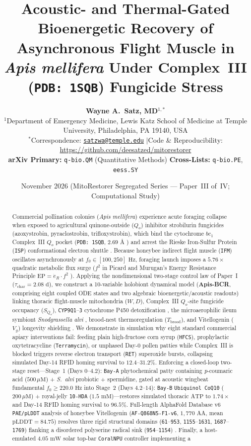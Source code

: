 \documentclass[11pt]{article}
\title{\LARGE\textbf{Acoustic- and Thermal-Gated Bioenergetic Recovery of Asynchronous Flight Muscle in \textit{Apis mellifera} Under Complex~III (\texttt{PDB: 1SQB}) Fungicide Stress}}
\author{
  \textbf{Wayne A.~Satz, MD}$^{1,*}$ \\[0.35em]
  {\small $^{1}$Department of Emergency Medicine, Lewis Katz School of Medicine at Temple University, Philadelphia, PA 19140, USA} \\
  {\small $^{*}$Correspondence: \href{mailto:satzwa@temple.edu}{\texttt{satzwa@temple.edu}} \quad$\vert$\quad Code \& Reproducibility: \url{https://github.com/deesatzed/mitorestorer}} \\
  {\small \textbf{arXiv Primary:} \texttt{q-bio.QM} (Quantitative Methods) \quad \textbf{Cross-Lists:} \texttt{q-bio.PE}, \texttt{eess.SY}}
}
\date{\small November 2026 \quad (MitoRestorer Segregated Series --- Paper~III of~IV; Computational Study)}
\begin{document}
\maketitle

\begin{abstract}
\noindent Commercial pollination colonies (\textit{Apis mellifera}) experience acute foraging collapse when exposed to agricultural quinone-outside ($Q_o$) inhibitor strobilurin fungicides (azoxystrobin, pyraclostrobin, trifloxystrobin), which bind the cytochrome $bc_1$ Complex~III $Q_o$ pocket (\texttt{PDB: 1SQB}, $2.69\text{ \AA}$ \cite{esser2006bc1}) and arrest the Rieske Iron-Sulfur Protein (\texttt{ISP}) conformational electron shuttle \cite{bartlett2002strobilurin}. Because honeybee indirect flight muscle (\texttt{IFM}) oscillates asynchronously at $f_0 \in [100, 250]\text{ Hz}$, foraging launch imposes a $5.76\times$ quadratic metabolic flux surge ($f^2$ in Picard and Murugan's Energy Resistance Principle $\mathrm{EP} = \dot{e}_R \cdot f^2$ \cite{picard2025energy}). Applying the nondimensional two-stage control law of Paper~I \cite{satz2026paper1,buckingham1914physically} ($\tau_{\mathrm{char}} = 2.08\text{ d}$), we construct a 10-variable holobiont dynamical model (\textbf{Apis-BCR}, comprising eight coupled ODE states and two algebraic bioenergetic/acoustic readouts) linking thoracic flight-muscle mitochondria ($W, D$), Complex~III $Q_o$-site fungicide occupancy ($S_{Q_o}$), \texttt{CYP9Q1}--\texttt{3} cytochrome P450 detoxification \cite{mao2013pcoumaric}, the microaerophilic ileum symbiont \textit{Snodgrassella alvi} \cite{leonard2020salvi}, brood-nest thermoregulation ($T_{\mathrm{brood}}$), and Vitellogenin ($V_g$) longevity shielding \cite{seehuus2006bee,spannhoff2011hda}. We demonstrate in simulation why eight standard commercial apiary interventions fail: feeding plain high-fructose corn syrup (\texttt{HFCS}), prophylactic oxytetracycline (\texttt{Terramycin}), or unphased Day-0 pollen patties while Complex~III is blocked triggers reverse electron transport (\texttt{RET}) superoxide bursts, collapsing simulated Day-14 RFID homing survival to $12.4\text{--}31.2\%$. Enforcing a closed-loop two-stage reset---Stage~1 (Days $0\text{--}4.2$): \texttt{Bay-A} phytochemical patty containing \textit{p}-coumaric acid ($500\,\mu\mathrm{M}$) + \textit{S.\ alvi} probiotic + spermidine, gated at acoustic wingbeat fundamental $f_0 \ge 220.0\text{ Hz}$ into Stage~2 (Days $4.2\text{--}14$): \texttt{Bay-B} \texttt{Ubiquinol CoQ10} ($200\,\mu\mathrm{M}$) + royal-jelly \texttt{10-HDA} ($1.5\text{ mM}$)---restores simulated thoracic $\mathrm{ATP}$ to $1.74\times$ and Day-14 RFID homing survival to $96.5\%$. Full-length AlphaFold Database v6 \cite{jumper2021alphafold,varadi2024afdb} \texttt{PAE/pLDDT} analysis of honeybee Vitellogenin (\texttt{AF-Q868N5-F1-v6}, $1{,}770\text{ AA}$, mean $\mathrm{pLDDT}=84.75$) resolves three rigid structural domains (\texttt{61}--\texttt{953}, \texttt{1155}--\texttt{1631}, \texttt{1687}--\texttt{1769}) flanking a disordered polyserine radical sink (\texttt{954}--\texttt{1154}) \cite{leipart2022vitellogenin,havukainen2013vitellogenin}. Finally, a host-emulated $4.05\text{ mW}$ solar top-bar \texttt{CoralNPU} controller implementing a 
\end{abstract}
\end{document}

